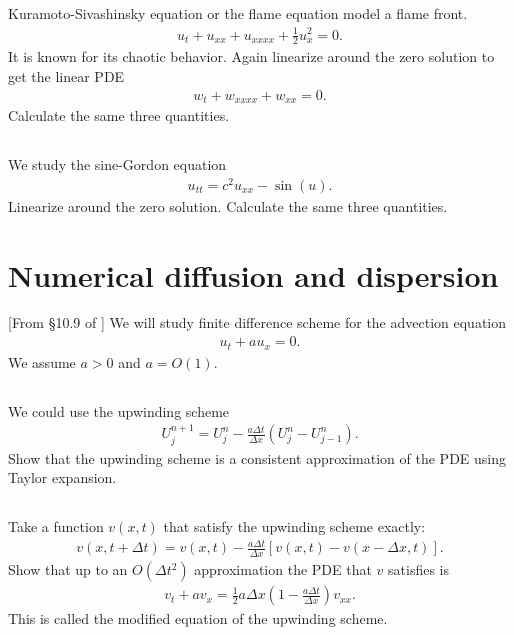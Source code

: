 \documentclass[11pt,letterpaper]{report}
\begin{document}
\subsection{}
Kuramoto-Sivashinsky equation or the flame equation model a flame front. 
\begin{align}
    u_t+u_{xx}+u_{xxxx}+\frac{1}{2}u_x^2 = 0.
\end{align}
It is known for its chaotic behavior. Again linearize around the zero solution to get the linear PDE
\begin{align}
    w_t+w_{xxxx}+w_{xx} = 0.
\end{align}
Calculate the same three quantities.

\subsection{}
We study the sine-Gordon equation
\begin{align}
    u_{tt} = c^2u_{xx}-\sin(u).
\end{align}
Linearize around the zero solution. Calculate the same three quantities.

\section{Numerical diffusion and dispersion}
[From \S10.9 of \cite{LeVeque_07}] We will study finite difference scheme for the advection equation
\begin{align}
    u_t+au_x = 0.
\end{align}
We assume $a>0$ and $a=O(1)$. 

\subsection{}
We could use the upwinding scheme
\begin{align}
    U^{n+1}_j = U^n_j-\frac{a\Delta t}{\Delta x}\left( U^n_j-U^n_{j-1} \right).
\end{align}
Show that the upwinding scheme is a consistent approximation of the PDE using Taylor expansion. 

\subsection{}
Take a function $v(x,t)$ that satisfy the upwinding scheme exactly:
\begin{align}
    v(x,t+\Delta t)=v(x,t)-\frac{a\Delta t}{\Delta x}\left[v(x,t)-v(x-\Delta x,t)\right].
\end{align}
Show that up to an $O(\Delta t^2)$ approximation the PDE that $v$ satisfies is
\begin{align}
    v_t+av_x = \frac{1}{2}a\Delta x\left(1-\frac{a\Delta t}{\Delta x}\right)v_{xx}.
\end{align}
This is called the modified equation of the upwinding scheme.
\end{document}
